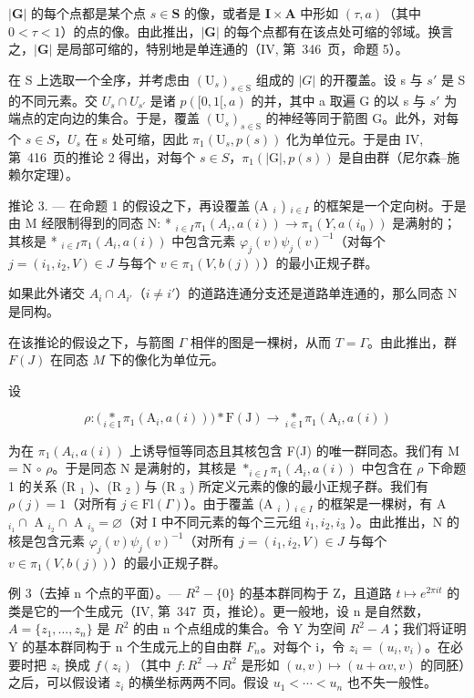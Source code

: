 \(|\mathbf{G}|\) 的每个点都是某个点 \(s \in \mathbf{S}\) 的像，或者是 \(\mathbf{I} \times \mathbf{A}\) 中形如 \((\tau, a)\)（其中 \(0 < \tau < 1\)）的点的像。由此推出，\(|\mathbf{G}|\) 的每个点都有在该点处可缩的邻域。换言之，\(|\mathbf{G}|\) 是局部可缩的，特别地是单连通的（IV, 第~346~页，命题 5）。

在 S 上选取一个全序，并考虑由 \((\mathrm{U}_{s})_{s\in\mathrm{S}}\) 组成的 \(|G|\) 的开覆盖。设 s 与 \(s'\) 是 S 的不同元素。交 \(U_{s}\cap U_{s'}\) 是诸 \(p([0,1[,a)\) 的并，其中 a 取遍 G 的以 s 与 \(s'\) 为端点的定向边的集合。于是，覆盖 \((\mathrm{U}_{s})_{s\in\mathrm{S}}\) 的神经等同于箭图 G。此外，对每个 \(s\in S\)，\(U_{s}\) 在 s 处可缩，因此 \(\pi_{1}(\mathrm{U}_{s},p(s))\) 化为单位元。于是由 IV, 第~416~页的推论 2 得出，对每个 \(s\in S\)，\(\pi_{1}(|\mathrm{G}|,p(s))\) 是自由群（尼尔森–施赖尔定理）。

推论 3. --- 在命题 1 的假设之下，再设覆盖 (A \(_{i}\) ) \(_{i\in I}\) 的框架是一个定向树。于是由 M 经限制得到的同态 N: * \(_{i\in I} \pi_{1}(A_{i},a(i)) \to \pi_{1}(Y,a(i_{0}))\) 是满射的；其核是 * \(_{i\in I} \pi_{1}(A_{i},a(i))\) 中包含元素 \(\varphi_{j}(v)\psi_{j}(v)^{-1}\)（对每个 \(j = (i_{1},i_{2},V) \in J\) 与每个 \(v \in \pi_{1}(V,b(j))\)）的最小正规子群。

如果此外诸交 \(A_{i} \cap A_{i'}\)（\(i \neq i'\)）的道路连通分支还是道路单连通的，那么同态 N 是同构。

在该推论的假设之下，与箭图 \(\Gamma\) 相伴的图是一棵树，从而 \(T = \Gamma\)。由此推出，群 \(F(J)\) 在同态 \(M\) 下的像化为单位元。

设

\[
\rho \colon \big (\underset {i \in \mathrm{I}} {\ast} \pi_ {1} (\mathrm{A} _ {i}, a (i)) \big) \ast \mathrm{F} (\mathrm{J}) \to \underset {i \in \mathrm{I}} {\ast} \pi_ {1} (\mathrm{A} _ {i}, a (i))
\]

为在 \(\pi_1(A_i, a(i))\) 上诱导恒等同态且其核包含 F(J) 的唯一群同态。我们有 M = N \(\circ\) \(\rho\)。于是同态 N 是满射的，其核是 \(*_{i \in I} \pi_1(A_i, a(i))\) 中包含在 \(\rho\) 下命题 1 的关系 (R \(_1\) )、(R \(_2\) ) 与 (R \(_3\) ) 所定义元素的像的最小正规子群。我们有 \(\rho(j) = 1\)（对所有 \(j \in \text{Fl}(\Gamma)\)）。由于覆盖 (A \(_i\) ) \(_{i \in I}\) 的框架是一棵树，有 A \(_{i_1} \cap\) A \(_{i_2} \cap\) A \(_{i_3} = \varnothing\)（对 I 中不同元素的每个三元组 \(i_1, i_2, i_3\) ）。由此推出，N 的核是包含元素 \(\varphi_j(v) \psi_j(v)^{-1}\)（对所有 \(j = (i_1, i_2, V) \in J\) 与每个 \(v \in \pi_1(V, b(j))\)）的最小正规子群。

例 3（去掉 n 个点的平面）。--- \(R^{2}-\{0\}\) 的基本群同构于 Z，且道路 \(t \mapsto e^{2\pi it}\) 的类是它的一个生成元（IV, 第~347~页，推论）。更一般地，设 n 是自然数，\(A = \{z_{1}, \ldots, z_{n}\}\) 是 \(R^{2}\) 的由 n 个点组成的集合。令 Y 为空间 \(R^{2}-A\)；我们将证明 Y 的基本群同构于 n 个生成元上的自由群 \(F_{n}\)。对每个 i，令 \(z_{i} = (u_{i}, v_{i})\)。在必要时把 \(z_{i}\) 换成 \(f(z_{i})\)（其中 \(f: R^{2} \to R^{2}\) 是形如 \((u, v) \mapsto (u + \alpha v, v)\) 的同胚）之后，可以假设诸 \(z_{i}\) 的横坐标两两不同。假设 \(u_{1} < \cdots < u_{n}\) 也不失一般性。

